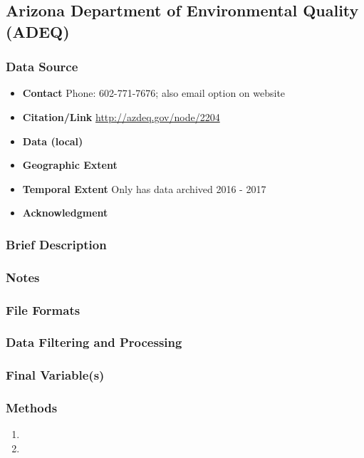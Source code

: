 \subsection{Arizona Department of Environmental Quality (ADEQ)}

\subsubsection*{Data Source}

\begin{itemize}[nolistsep]
\item \textbf{Contact}  Phone: 602-771-7676; also email option on website
\item \textbf{Citation/Link} \url{http://azdeq.gov/node/2204}
\item \textbf{Data (local)} 
\item \textbf{Geographic Extent} 
\item \textbf{Temporal Extent} 
Only has data archived 2016 - 2017
\item \textbf{Acknowledgment} 
\end{itemize}

\subsubsection*{Brief Description}

\subsubsection*{Notes}

\subsubsection*{File Formats} 

\subsubsection*{Data Filtering and Processing}

\subsubsection*{Final Variable(s)}

\subsubsection*{Methods}

\begin{enumerate}
\item 
\item
\end{enumerate}

